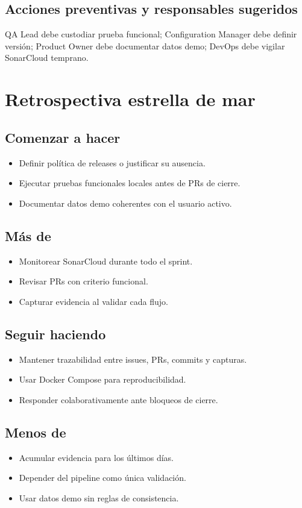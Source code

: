 \documentclass[11pt,a4paper]{article}
\begin{document}
\subsection{Acciones preventivas y responsables sugeridos}
QA Lead debe custodiar prueba funcional; Configuration Manager debe definir versión; Product Owner debe documentar datos demo; DevOps debe vigilar SonarCloud temprano.

\section{Retrospectiva estrella de mar}
\subsection{Comenzar a hacer}
\begin{itemize}
\item Definir política de releases o justificar su ausencia.
\item Ejecutar pruebas funcionales locales antes de PRs de cierre.
\item Documentar datos demo coherentes con el usuario activo.
\end{itemize}

\subsection{Más de}
\begin{itemize}
\item Monitorear SonarCloud durante todo el sprint.
\item Revisar PRs con criterio funcional.
\item Capturar evidencia al validar cada flujo.
\end{itemize}

\subsection{Seguir haciendo}
\begin{itemize}
\item Mantener trazabilidad entre issues, PRs, commits y capturas.
\item Usar Docker Compose para reproducibilidad.
\item Responder colaborativamente ante bloqueos de cierre.
\end{itemize}

\subsection{Menos de}
\begin{itemize}
\item Acumular evidencia para los últimos días.
\item Depender del pipeline como única validación.
\item Usar datos demo sin reglas de consistencia.
\end{itemize}
\end{document}
